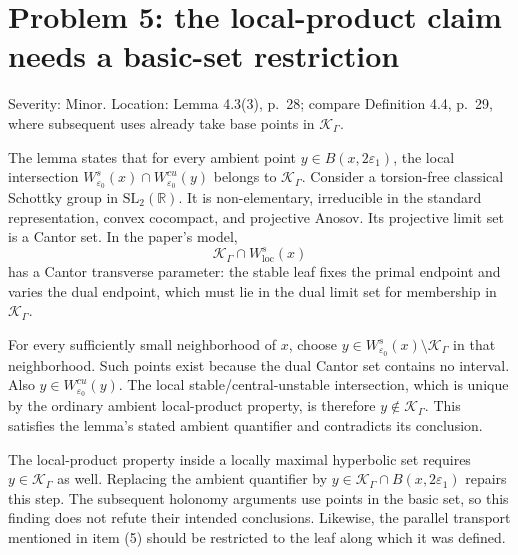 \documentclass[10pt]{article}
\begin{document}
\section*{Problem 5: the local-product claim needs a basic-set restriction}
Severity: Minor. Location: Lemma 4.3(3), p. 28; compare Definition 4.4, p. 29, where subsequent uses already take base points in \(\mathcal K_\Gamma\).\par
The lemma states that for every ambient point \(y\in B(x,2\varepsilon_1)\), the local intersection \(W^s_{\varepsilon_0}(x)\cap W^{cu}_{\varepsilon_0}(y)\) belongs to \(\mathcal K_\Gamma\). Consider a torsion-free classical Schottky group in \(\mathrm{SL}_2(\mathbb R)\). It is non-elementary, irreducible in the standard representation, convex cocompact, and projective Anosov. Its projective limit set is a Cantor set. In the paper’s model, \[\mathcal K_\Gamma\cap W^s_{\mathrm{loc}}(x)\] has a Cantor transverse parameter: the stable leaf fixes the primal endpoint and varies the dual endpoint, which must lie in the dual limit set for membership in \(\mathcal K_\Gamma\).\par
For every sufficiently small neighborhood of \(x\), choose \(y\in W^s_{\varepsilon_0}(x)\setminus\mathcal K_\Gamma\) in that neighborhood. Such points exist because the dual Cantor set contains no interval. Also \(y\in W^{cu}_{\varepsilon_0}(y)\). The local stable/central-unstable intersection, which is unique by the ordinary ambient local-product property, is therefore \(y\notin\mathcal K_\Gamma\). This satisfies the lemma’s stated ambient quantifier and contradicts its conclusion.\par
The local-product property inside a locally maximal hyperbolic set requires \(y\in\mathcal K_\Gamma\) as well. Replacing the ambient quantifier by \(y\in\mathcal K_\Gamma\cap B(x,2\varepsilon_1)\) repairs this step. The subsequent holonomy arguments use points in the basic set, so this finding does not refute their intended conclusions. Likewise, the parallel transport mentioned in item (5) should be restricted to the leaf along which it was defined.\par
\end{document}
